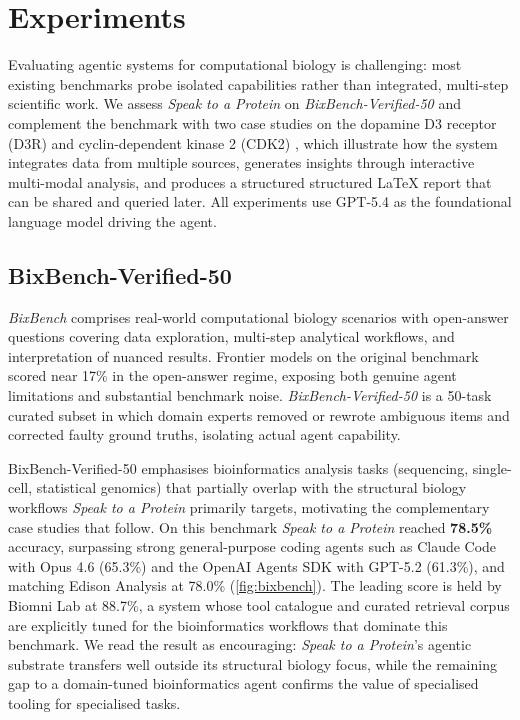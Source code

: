 \documentclass[journal=jcisd8,manuscript=article]{achemso}
\begin{document}


\section{Experiments}\label{sec:cases}
Evaluating agentic systems for computational biology is challenging: most existing benchmarks probe isolated capabilities rather than integrated, multi-step scientific work. We assess \emph{Speak to a Protein} on \emph{BixBench-Verified-50} \citep{phylo2026bixbenchverified} and complement the benchmark with two case studies on the dopamine D3 receptor (D3R) \citep{Chien2010} and cyclin-dependent kinase 2 (CDK2) \citep{Malumbres2009}, which illustrate how the system integrates data from multiple sources, generates insights through interactive multi-modal analysis, and produces a structured structured LaTeX report that can be shared and queried later. All experiments use GPT-5.4 as the foundational language model driving the agent.

\subsection{BixBench-Verified-50}\label{subsec:bixbench}
\emph{BixBench} \citep{mitchener2025bixbench} comprises real-world computational biology scenarios with open-answer questions covering data exploration, multi-step analytical workflows, and interpretation of nuanced results. Frontier models on the original benchmark scored near 17\% in the open-answer regime, exposing both genuine agent limitations and substantial benchmark noise. \emph{BixBench-Verified-50} \citep{phylo2026bixbenchverified} is a 50-task curated subset in which domain experts removed or rewrote ambiguous items and corrected faulty ground truths, isolating actual agent capability.

BixBench-Verified-50 emphasises bioinformatics analysis tasks (sequencing, single-cell, statistical genomics) that partially overlap with the structural biology workflows \emph{Speak to a Protein} primarily targets, motivating the complementary case studies that follow. On this benchmark \emph{Speak to a Protein} reached \textbf{78.5\%} accuracy, surpassing strong general-purpose coding agents such as Claude Code with Opus 4.6 (65.3\%) and the OpenAI Agents SDK with GPT-5.2 (61.3\%), and matching Edison Analysis at 78.0\% (\cref{fig:bixbench}). The leading score is held by Biomni Lab \citep{huang2025biomni} at 88.7\%, a system whose tool catalogue and curated retrieval corpus are explicitly tuned for the bioinformatics workflows that dominate this benchmark. We read the result as encouraging: \emph{Speak to a Protein}'s agentic substrate transfers well outside its structural biology focus, while the remaining gap to a domain-tuned bioinformatics agent confirms the value of specialised tooling for specialised tasks.
\end{document}
